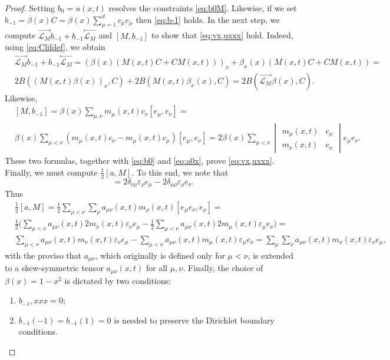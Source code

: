 \documentclass[10pt,a4paper]{article}
\numberwithin{equation}{section}
\theoremstyle{plain}
\theoremstyle{definition}
\renewcommand{\epsilon}{\varepsilon}
\newcommand{\InMb}{\stackrel{\leftarrow}{\mathcal{L}_{M}}}
\newcommand{\InMf}{\stackrel{\rightarrow}{\mathcal{L}_{M}}}
\begin{document}
\begin{proof}
Setting $b_0=u(x,t)$ resolves the constraints \eqref{eq:b0M}.  Likewise, if we set $b_{-1}=\beta(x) C=\beta(x)\sum_{\mu=1}^d c_\mu e_\mu$ then \eqref{eq:b-1} holds.  
In the next step, we compute $\InMf b_{-1}+b_{-1}\InMb$ and $[M,b_{-1}]$ to show that \autoref{eq:vx,uxxx} hold.  Indeed, using \eqref{eq:Clifdef}, we obtain
\begin{equation} 
\begin{split} 
&\InMf b_{-1}+b_{-1}\InMb=(\beta(x)(M(x,t)C+CM(x,t)))_x+\beta_{x}(x)(M(x, t)C+CM(x,t))=\\
 &2B((M(x,t)\beta(x))_x,C)+2B(M(x,t)\beta_x(x),C)=2B(\InMf \beta(x),C).  
 \end{split}
\end{equation} 
Likewise, 
\begin{equation} 
\begin{split}
&[M,b_{-1}]=\beta(x)\sum_{\mu,\nu}m_\mu(x,t)c_\nu[e_\mu,e_\nu]=\\
&\beta(x)\sum_{\mu<\nu}(m_\mu(x,t)c_\nu-m_\mu(x,t) c_\mu)[e_\mu,e_\nu]=2\beta(x)\sum_{\mu<\nu} \begin{vmatrix} m_\mu(x,t)&c_\mu\\m_\nu(x,t)&c_\nu \end{vmatrix} e_\mu e_\nu. 
\end{split} 
\end{equation}
These two formulas, together with \eqref{eq:b0} and \eqref{eq:a0x},  prove \eqref{eq:vx,uxxx}.  Finally, we must compute $\frac12 [a,M]$.  
To this end, we note that 
\begin{equation} 
[e_\mu e_\nu, e_\rho]=2\delta_{\nu \rho} \epsilon_\rho e_\mu-2\delta_{\mu \rho}\epsilon_\rho  e_\nu.  
\end{equation} 
Thus 
\begin{equation} 
\begin{split}
&\frac12[a,M]=\frac12 \sum_{\mu<\nu} \sum_{\rho} a_{\mu \nu}(x,t)m_\rho(x,t)[e_\mu e_\nu, e_\rho]=\\
&\frac12 \big( \sum_{\mu<\nu} a_{\mu \nu}(x,t) 2m_\nu(x,t) \epsilon_\nu e_\mu-\frac12 \sum_{\mu<\nu}a_{\mu \nu}(x,t) 2m_\mu (x,t) \epsilon _\mu  e_\nu \big)=\\
&\sum_{\mu< \nu} a_{\mu \nu }(x,t) m_\nu(x,t)  \epsilon_\nu e_\mu- \sum_{\mu<\nu}a_{\mu \nu }(x,t) m_\mu (x,t) \epsilon_\mu  e_\nu=
\sum_\mu \sum_\nu  a_{\mu \nu}(x,t) m_\nu (x,t) \epsilon_\nu  e_\mu, 
\end{split}
\end{equation} 
with the proviso that $a_{\mu \nu}$, which originally is defined only for $\mu<\nu$,  is extended to a skew-symmetric tensor $a_{\mu \nu}(x,t)$ for all $\mu, \nu$.  Finally, the choice of $\beta(x)=1-x^2$ is dictated by two conditions: 
\begin{enumerate} 
\item $b_{-1},xxx=0$; 
\item $b_{-1}(-1)=b_{-1}(1)=0$  is needed to preserve the Dirichlet boundary conditions.  
\end{enumerate} 
\end{proof} 
\end{document}
